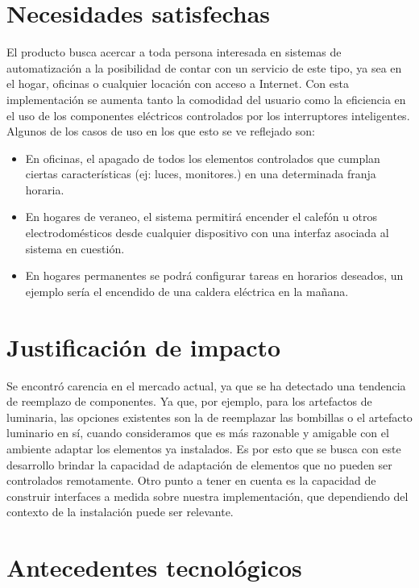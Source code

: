 \section{Necesidades satisfechas}
El producto busca acercar a toda persona interesada en sistemas de automatización a la posibilidad de contar con un servicio de este tipo, ya sea en el hogar, oficinas o cualquier locación con acceso a Internet.
Con esta implementación se aumenta tanto la comodidad del usuario como la eficiencia en el uso de los componentes eléctricos controlados por los interruptores inteligentes. Algunos de los casos de uso en los que esto se ve reflejado son:

\begin{itemize}
	\item En oficinas, el apagado de todos los elementos controlados que cumplan ciertas características (ej: luces, monitores.) en una determinada franja horaria.
	\item En hogares de veraneo, el sistema permitirá encender el calefón u otros electrodomésticos desde cualquier dispositivo con una interfaz asociada al sistema en cuestión.
	\item En hogares permanentes se podrá configurar tareas en horarios deseados, un ejemplo sería el encendido de una caldera eléctrica en la mañana.
\end{itemize}

\section{Justificación de impacto}

Se encontró carencia en el mercado actual, ya que se ha detectado una tendencia de reemplazo de componentes. Ya que, por ejemplo, para los artefactos de luminaria, las opciones existentes son la de reemplazar las bombillas o el artefacto luminario en sí, cuando consideramos que es más razonable y amigable con el ambiente adaptar los elementos ya instalados. Es por esto que se busca con este desarrollo brindar la capacidad de adaptación de elementos que no pueden ser controlados remotamente.
Otro punto a tener en cuenta es la capacidad de construir interfaces a medida sobre nuestra implementación, que dependiendo del contexto de la instalación puede ser relevante.

\section{Antecedentes tecnológicos}


